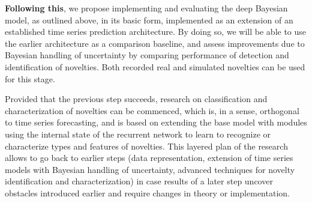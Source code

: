 \documentclass[runningheads]{llncs}
\begin{document}
\textbf{Following this}, we propose implementing and evaluating the deep
Bayesian model, as outlined above, in its basic form, implemented as an
extension of an established time series prediction architecture. By doing so,
we will be able to use the earlier architecture as a comparison baseline, and
assess improvements due to Bayesian handling of uncertainty by comparing
performance of detection and identification of novelties. Both recorded real
and simulated novelties can be used for this stage.

Provided that the previous step succeeds, research on classification and
characterization of novelties can be commenced, which is, in a sense,
orthogonal to time series forecasting, and is based on extending the base model
with modules using the internal state of the recurrent network to learn to
recognize or characterize types and features of novelties. This layered plan of
the research allows to go back to earlier steps (data representation, extension
of time series models with Bayesian handling of uncertainty, advanced
techniques for novelty identification and characterization) in case results of
a later step uncover obstacles introduced earlier and require changes in theory
or implementation. 
\end{document}
